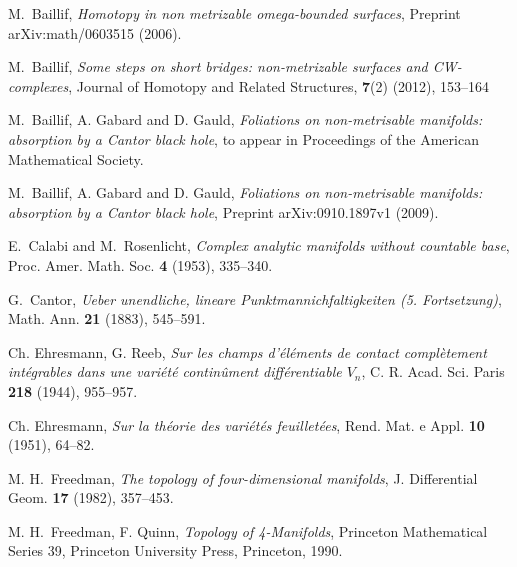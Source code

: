 \documentclass{amsart}
\begin{document}
\begin{thebibliography}{30}

\iffalse

\bibitem{Alexandroff}
P.~Alexandroff, \textsl{\"Uber die Metrisation der im Kleinen
kompakten topologischen R\"aume}, Math. Ann. {\bf 92} (1924),
294--301.

\bibitem{vdBan} E.~van den Ban, \textsl{Notes for the course foliation theory}, 2006,\\
http://www.math.uu.nl/people/ban/foliations2006/foliations.pdf

\fi

M.~Baillif, \textsl{Homotopy in non metrizable omega-bounded surfaces},
Preprint arXiv:math/0603515 (2006).

M.~Baillif, \textsl{Some steps on short bridges: non-metrizable surfaces and {CW}-complexes}, Journal of Homotopy and Related Structures, {\bf 7}(2) (2012), 153--164

M.~Baillif, A. Gabard and D. Gauld, \textsl{Foliations on non-metrisable manifolds: absorption by a Cantor black hole}, to appear in Proceedings of the American Mathematical Society.

M.~Baillif, A. Gabard and D. Gauld, \textsl{Foliations on non-metrisable manifolds: absorption by a Cantor black hole}, Preprint arXiv:0910.1897v1 (2009).

E.~Calabi and M.~Rosenlicht, \textsl{Complex analytic manifolds without countable base}, 
Proc. Amer. Math. Soc. {\bf 4} (1953), 335--340.

\iffalse

G.~Cantor, \textsl{Ueber unendliche, lineare
Punktmannichfaltigkeiten (5. Fortsetzung)}, Math. Ann. {\bf
21} (1883), 545--591.

Ch. Ehresmann, G. Reeb, \textsl{Sur les champs d'\'el\'ements
de contact compl\`etement int\'egrables dans une vari\'et\'e
contin\^ument diff\'erentiable $V_n$}, C. R. Acad. Sci. Paris
{\bf 218} (1944), 955--957.

Ch. Ehresmann, \textsl{Sur la th\'eorie des vari\'et\'es
feuillet\'ees}, Rend. Mat. e Appl. {\bf 10} (1951), 64--82.

M. H.~Freedman, \textsl{The topology of four-dimensional
manifolds}, J. Differential Geom. {\bf 17} (1982), 357--453.

M. H.~Freedman, F. Quinn, {\em Topology of 4-Manifolds},
Princeton Mathematical Series 39, Princeton University Press,
Princeton, 1990.


\end{thebibliography}
\end{document}
